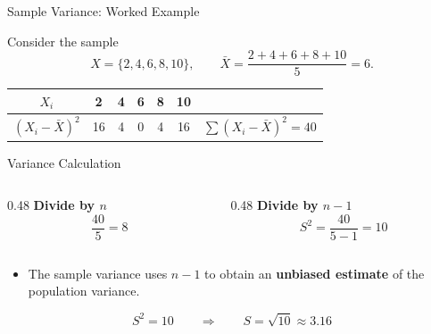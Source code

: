 \documentclass{beamer}
\begin{document}
\begin{frame}{Sample Variance: Worked Example}

Consider the sample
\[
X=\{2,4,6,8,10\},
\qquad
\bar X=\frac{2+4+6+8+10}{5}=6.
\]

\vspace{-0.15cm}

\begin{center}
\renewcommand{\arraystretch}{1.15}
\begin{tabular}{c|ccccc|c}
$X_i$ & 2 & 4 & 6 & 8 & 10 & \\ \hline
$(X_i-\bar X)^2$ & 16 & 4 & 0 & 4 & 16 &
$\displaystyle \sum (X_i-\bar X)^2=40$
\end{tabular}
\end{center}

\vspace{0.2cm}

\begin{block}{Variance Calculation}
\begin{columns}[T,onlytextwidth]

\begin{column}{0.48\textwidth}
\centering
\textbf{Divide by $n$}
\[
\frac{40}{5}=8
\]
\end{column}

\begin{column}{0.48\textwidth}
\centering
\textbf{Divide by $n-1$}
\[
S^2=\frac{40}{5-1}=10
\]
\end{column}

\end{columns}
\end{block}

\vspace{-0.05cm}

\begin{itemize}
    \item The sample variance uses $n-1$ to obtain an
          \textbf{unbiased estimate} of the population variance.
\end{itemize}

\vspace{-0.1cm}

\begin{center}
\[
\boxed{S^2=10}
\qquad\Longrightarrow\qquad
\boxed{S=\sqrt{10}\approx3.16}
\]
\end{center}

\end{frame}

\end{document}
